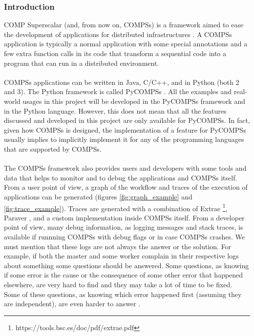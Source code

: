 \label{sec:compss}
\subsubsection{Introduction}
COMP Superscalar (and, from now on, COMPSs) is a framework aimed to ease the development of applications for distributed infrastructures \cite{compss} \cite{Lordan2014}. A COMPSs application is typically a normal application with some special annotations and a few extra function calls in its code that transform a sequential code into a program that can run in a distributed environment.\\
\\
COMPSs applications can be written in Java, C/C++, and in Python (both 2 and 3). The Python framework is called PyCOMPSs \cite{pycompss}. All the examples and real-world usages in this project will be developed in the PyCOMPSs framework and in the Python language. However, this does not mean that all the features discussed and developed in this project are only available for PyCOMPSs. In fact, given how COMPSs is designed, the implementation of a feature for PyCOMPSs usually implies to implicitly implement it for any of the programming languages that are supported by COMPSs.\\
\\
The COMPSs framework also provides users and developers with some tools and data that helps to monitor and to debug the applications and COMPSs itself. From a user point of view, a graph of the workflow and traces of the execution of applications can be generated (figures \ref{fig:graph_example}  and \ref{fig:trace_example}). Traces are generated with a combination of Extrae \footnote{https://tools.bsc.es/doc/pdf/extrae.pdf}, Paraver \cite{paraver}, and a custom implementation inside COMPSs itself. From a developer point of view, many debug information, as logging messages and stack traces, is available if runnning COMPSs with debug flags or in case COMPSs crashes. We must mention that these logs are not always the answer or the solution. For example, if both the master and some worker complain in their respective logs about something some questions should be answered. Some questions, as knowing if some error is the cause or the consequence of some other error that happened elsewhere, are very hard to find and they may take a lot of time to be fixed.  Some of these questions, as knowing which error happened first (assuming they are independent), are even harder to answer \cite{Lamport}. 

